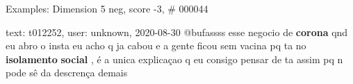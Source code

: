 \begin{frame}{Examples: Dimension 5 neg, score -3, \# 000044}
\footnotesize
\begin{alertblock}{text: t012252, user: unknown, 2020-08-30}
@bufassss esse negocio de \textbf{corona} qnd eu abro o insta eu acho q ja 
cabou e a gente ficou sem vacina pq ta no \textbf{isolamento} \textbf{social} , 
é a unica explicaçao q eu consigo pensar de ta assim pq n pode sê da descrença 
demais 
\end{alertblock}
\end{frame}
